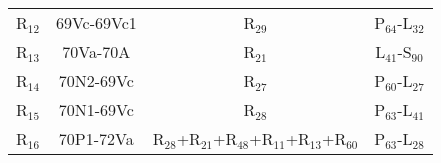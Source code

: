 \begin{table}[H]
{\begin{center}
{\begin{tabular}{ c c c c }
                    R$_{12}$ & 69Vc-69Vc1 & R$_{29}$ & P$_{64}$-L$_{32}$\\
                    R$_{13}$ & 70Va-70A & R$_{21}$ & L$_{41}$-S$_{90}$\\
                    R$_{14}$ & 70N2-69Vc & R$_{27}$ & P$_{60}$-L$_{27}$\\
                    R$_{15}$ & 70N1-69Vc & R$_{28}$ & P$_{63}$-L$_{41}$\\
                    R$_{16}$ & 70P1-72Va & R$_{28}$+R$_{21}$+R$_{48}$+R$_{11}$+R$_{13}$+R$_{60}$ & P$_{63}$-L$_{28}$\\
                \hline
            \end{tabular}
            }
            \end{center}
        }    
    \end{table}

	
